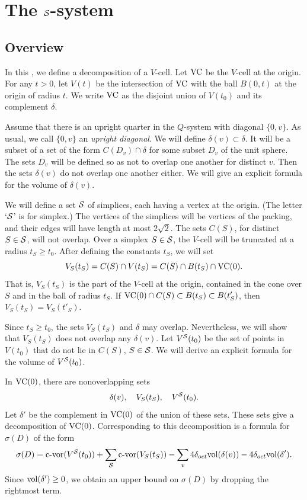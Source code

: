 \chapter{The ${\mathcal S}$-system}
    \label{sec:fine}


\section{Overview}
    \label{sec:fine-overview}



In this \chap, we define a decomposition of a $V$-cell. Let
${\operatorname{VC}}$ be the $V$-cell at the origin.  For any $t > 0$, let
$V(t)$ be the intersection of ${\operatorname{VC}}$ with the ball $B(0,t)$ at
the origin of radius $t$. We write ${\operatorname{VC}}$ as the disjoint union
of $V(t_0)$ and its complement $\delta$.

Assume that there is an upright quarter in the $Q$-system with
diagonal $\{0,v\}$. As usual, we call $\{0,v\}$ an {\it upright diagonal}.
We will define $\delta(v)\subset\delta$. It will be a subset of a
set of the form $C(D_v)\cap\delta$ for some subset $D_v$ of the
unit sphere.  The sets $D_v$ will be defined so as not to overlap
one another for distinct $v$. Then the sets $\delta(v)$ do not
overlap one another either. We will give an explicit formula for
the volume of $\delta(v)$.

We will define a set ${\mathcal S}$ of simplices, each having a vertex at
the origin. (The letter `${\mathcal S}$' is for simplex.)
The vertices of the simplices will be vertices of the
packing, and their edges will have length at most $2\sqrt{2}$. The
sets $C(S)$, for distinct $S\in{\mathcal S}$, will not overlap. Over a
simplex $S\in{\mathcal S}$, the $V$-cell will be truncated at a radius
$t_S\ge t_0$. After defining the constants $t_S$, we will set
    $$V_S(t_S) = C(S) \cap V(t_S) =C(S)\cap B(t_S)\cap {\operatorname{VC}}(0).$$
That is, $V_S(t_S)$ is the part of the $V$-cell at the origin,
contained in the cone over $S$ and in the ball of radius $t_S$.
If
    ${\operatorname{VC}}(0) \cap C(S)\subset B(t_S)\subset B(t'_S)$,
then
    $V_S(t_S)=V_S(t'_S)$.

Since $t_S\ge t_0$, the sets $V_S(t_S)$ and $\delta$ may overlap.
Nevertheless, we will show that $V_S(t_S)$ does not overlap any
$\delta(v)$.  Let $V^{{\mathcal S}}(t_0)$ be the set of points in $V(t_0)$
that do not lie in $C(S)$, $S\in{\mathcal S}$.  We will derive an
explicit formula for the volume of $V^{{\mathcal S}}(t_0)$.

In ${\operatorname{VC}}(0)$, there are nonoverlapping sets
$$\delta(v),\quad   V_S(t_S),\quad V^{{\mathcal S}}(t_0).$$
Let $\delta'$ be the complement in ${\operatorname{VC}}(0)$ of the union of
these sets. These sets give a decomposition of ${\operatorname{VC}}(0)$.
Corresponding to this decomposition is a formula for $\sigma(D)$
of the form
    $$
    \sigma(D) =
        {\operatorname{c-vor}}(V^{{\mathcal S}}(t_0))
        + \sum_{{\mathcal S}}{\operatorname{c-vor}}(V_S(t_S))
        -\sum_v 4\delta_{oct}{\operatorname{vol}}(\delta(v))-4\delta_{oct}{\operatorname{vol}}(\delta').
    $$
Since ${\operatorname{vol}}(\delta')\ge0$, we obtain an upper bound on
$\sigma(D)$ by dropping the rightmost term.



